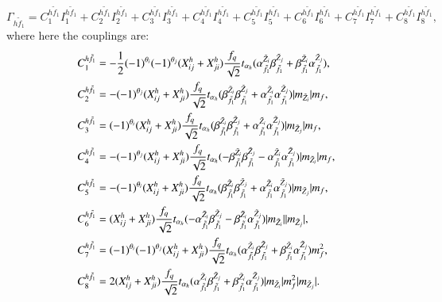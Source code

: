\documentclass[final,3p,times]{elsarticle}
\begin{document}
\begin{equation}
\Gamma_{h \tilde{f}_1} = C_{1}^{h \tilde{f}_1} I_{1}^{h \tilde{f}_1} + C_{2}^{h \tilde{f}_1} I_{2}^{h \tilde{f}_1} + C_{3}^{h \tilde{f}_1} I_{3}^{h \tilde{f}_1} + C_{4}^{h \tilde{f}_1} I_{4}^{h \tilde{f}_1} + C_{5}^{h \tilde{f}_1} I_{5}^{h \tilde{f}_1} + C_{6}^{h \tilde{f}_1} I_{6}^{h \tilde{f}_1} + C_{7}^{h \tilde{f}_1} I_{7}^{h \tilde{f}_1} + C_{8}^{h \tilde{f}_1} I_{8}^{h \tilde{f}_1},
\end{equation}
where here the couplings are:
\begin{align}
C_{1}^{h \tilde{f}_1} &= -\frac{1}{2}(-1)^{\theta_i}(-1)^{\theta_j}(X_{ij}^h + X_{ji}^h) {f_q \over \sqrt{2}} t_{\alpha_h} ({\alpha_{\tilde{f}_1}^{\tilde{Z}_i}} {\beta_{\tilde{f}_1}^{\tilde{Z}_j}} + {\beta_{\tilde{f}_1}^{\tilde{Z}_i}}{\alpha_{\tilde{f}_1}^{\tilde{Z}_j}}), \\
C_{2}^{h \tilde{f}_1} &= -(-1)^{\theta_j}(X_{ij}^h + X_{ji}^h) {f_q \over \sqrt{2}} t_{\alpha_h} ({\beta_{\tilde{f}_1}^{\tilde{Z}_i}} {\beta_{\tilde{f}_1}^{\tilde{Z}_j}} + {\alpha_{\tilde{f}_1}^{\tilde{Z}_i}}{\alpha_{\tilde{f}_1}^{\tilde{Z}_j}})|m_{\tilde{Z}_i}| m_f, \\
C_{3}^{h \tilde{f}_1} &= (-1)^{\theta_i}(X_{ij}^h + X_{ji}^h) {f_q \over \sqrt{2}} t_{\alpha_h} ({\beta_{\tilde{f}_1}^{\tilde{Z}_i}} {\beta_{\tilde{f}_1}^{\tilde{Z}_j}} + {\alpha_{\tilde{f}_1}^{\tilde{Z}_i}}{\alpha_{\tilde{f}_1}^{\tilde{Z}_j}})|m_{\tilde{Z}_j}| m_f, \\
C_{4}^{h \tilde{f}_1} &= -(-1)^{\theta_j}(X_{ij}^h + X_{ji}^h) {f_q \over \sqrt{2}} t_{\alpha_h} (-{\beta_{\tilde{f}_1}^{\tilde{Z}_i}} {\beta_{\tilde{f}_1}^{\tilde{Z}_j}} - {\alpha_{\tilde{f}_1}^{\tilde{Z}_i}}{\alpha_{\tilde{f}_1}^{\tilde{Z}_j}})|m_{\tilde{Z}_i}| m_f, \\
C_{5}^{h \tilde{f}_1} &= -(-1)^{\theta_i}(X_{ij}^h + X_{ji}^h) {f_q \over \sqrt{2}} t_{\alpha_h} ({\beta_{\tilde{f}_1}^{\tilde{Z}_i}} {\beta_{\tilde{f}_1}^{\tilde{Z}_j}} + {\alpha_{\tilde{f}_1}^{\tilde{Z}_i}}{\alpha_{\tilde{f}_1}^{\tilde{Z}_j}})|m_{\tilde{Z}_j}| m_f, \\
C_{6}^{h \tilde{f}_1} &= (X_{ij}^h + X_{ji}^h) {f_q \over \sqrt{2}} t_{\alpha_h} (-{\alpha_{\tilde{f}_1}^{\tilde{Z}_i}} {\beta_{\tilde{f}_1}^{\tilde{Z}_j}} - {\beta_{\tilde{f}_1}^{\tilde{Z}_i}}{\alpha_{\tilde{f}_1}^{\tilde{Z}_j}})|m_{\tilde{Z}_i}||m_{\tilde{Z}_j}|, \\
C_{7}^{h \tilde{f}_1} &= (-1)^{\theta_i}(-1)^{\theta_j}(X_{ij}^h + X_{ji}^h) {f_q \over \sqrt{2}} t_{\alpha_h} ({\alpha_{\tilde{f}_1}^{\tilde{Z}_i}} {\beta_{\tilde{f}_1}^{\tilde{Z}_j}} + {\beta_{\tilde{f}_1}^{\tilde{Z}_i}}{\alpha_{\tilde{f}_1}^{\tilde{Z}_j}})m_{f}^2, \\
C_{8}^{h \tilde{f}_1} &= 2(X_{ij}^h + X_{ji}^h) {f_q \over \sqrt{2}} t_{\alpha_h} ({\alpha_{\tilde{f}_1}^{\tilde{Z}_i}} {\beta_{\tilde{f}_1}^{\tilde{Z}_j}} + {\beta_{\tilde{f}_1}^{\tilde{Z}_i}}{\alpha_{\tilde{f}_1}^{\tilde{Z}_j}})|m_{\tilde{Z}_i}|m_{f}^2 |m_{\tilde{Z}_j}|.
\end{align}
\end{document}
